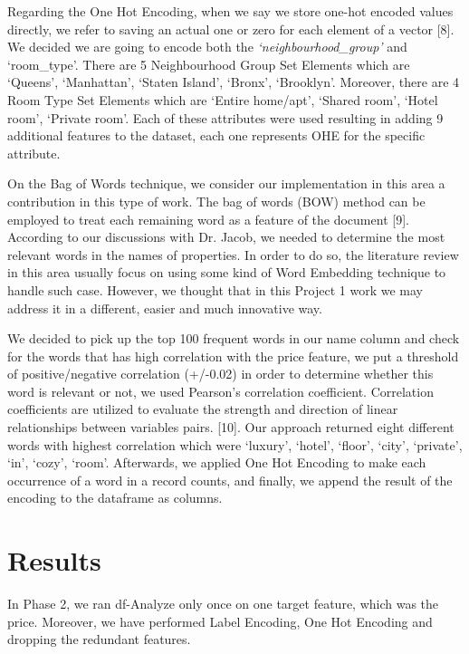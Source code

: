 \documentclass[a4paper,12pt]{article}
\begin{document}
Regarding the One Hot Encoding, when we say we store one-hot encoded values directly, we refer to saving an actual one or zero for each element of a vector [8]. We decided we are going to encode both the \textit{`neighbourhood\_group' } and `room\_type'. There are 5 Neighbourhood Group Set Elements which are `Queens', `Manhattan', `Staten Island', `Bronx', `Brooklyn'. Moreover, there are 4 Room Type Set Elements which are `Entire home/apt', `Shared room', `Hotel room', `Private room'. Each of these attributes were used resulting in adding 9 additional features to the dataset, each one represents OHE for the specific attribute. \newline

On the Bag of Words technique, we consider our implementation in this area a contribution in this type of work. The bag of words (BOW) method can be employed to treat each remaining word as a feature of the document [9]. According to our discussions with Dr. Jacob, we needed to determine the most relevant words in the names of properties. In order to do so, the literature review in this area usually focus on using some kind of Word Embedding technique to handle such case. However, we thought that in this Project 1 work we may address it in a different, easier and much innovative way. 

We decided to pick up the top 100 frequent words in our name column and check for the words that has high correlation with the price feature, we put a threshold of positive/negative correlation (+/-0.02) in order to determine whether this word is relevant or not, we used Pearson's correlation coefficient. Correlation coefficients are utilized to evaluate the strength and direction of linear relationships between variables pairs. [10]. Our approach returned eight different words with highest correlation which were `luxury', `hotel', `floor', `city', `private', `in', `cozy', `room'. Afterwards, we applied One Hot Encoding to make each occurrence of a word in a record counts, and finally, we append the result of the encoding to the dataframe as columns.

\section*{Results}

In Phase 2, we ran df-Analyze only once on one target feature, which was the price. Moreover, we have performed Label Encoding, One Hot Encoding and dropping the redundant features.
\end{document}
